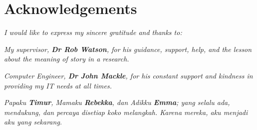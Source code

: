 \newpage
\centering
\section*{Acknowledgements} 

\vspace{6cm}
\textit{I would like to express my sincere gratitude and thanks to:}

\vspace{1cm}

\textit{My supervisor, \textbf{Dr Rob Watson}, for his guidance, support, help, and the lesson about the meaning of story in a research.}

\textit{Computer Engineer, \textbf{Dr John Mackle}, for his constant support and kindness in providing my IT needs at all times.}

\textit{Papaku \textbf{Timur}, Mamaku \textbf{Rebekka}, dan Adikku \textbf{Emma}; yang selalu ada, mendukung, dan percaya disetiap koko melangkah. Karena mereka, aku menjadi aku yang sekarang.}





